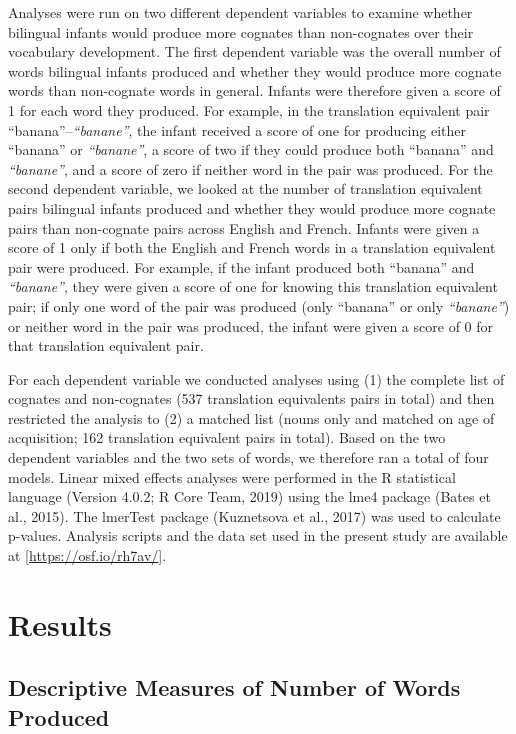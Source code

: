 \documentclass[
  english,
  ,man,floatsintext]{apa6}
\begin{document}
Analyses were run on two different dependent variables to examine whether bilingual infants would produce more cognates than non-cognates over their vocabulary development. The first dependent variable was the overall number of words bilingual infants produced and whether they would produce more cognate words than non-cognate words in general. Infants were therefore given a score of 1 for each word they produced. For example, in the translation equivalent pair ``banana''--\emph{``banane''}, the infant received a score of one for producing either ``banana'' or \emph{``banane''}, a score of two if they could produce both ``banana'' and \emph{``banane''}, and a score of zero if neither word in the pair was produced. For the second dependent variable, we looked at the number of translation equivalent pairs bilingual infants produced and whether they would produce more cognate pairs than non-cognate pairs across English and French. Infants were given a score of 1 only if both the English and French words in a translation equivalent pair were produced. For example, if the infant produced both ``banana'' and \emph{``banane''}, they were given a score of one for knowing this translation equivalent pair; if only one word of the pair was produced (only ``banana'' or only \emph{``banane''}) or neither word in the pair was produced, the infant were given a score of 0 for that translation equivalent pair.

For each dependent variable we conducted analyses using (1) the complete list of cognates and non-cognates (537 translation equivalents pairs in total) and then restricted the analysis to (2) a matched list (nouns only and matched on age of acquisition; 162 translation equivalent pairs in total). Based on the two dependent variables and the two sets of words, we therefore ran a total of four models. Linear mixed effects analyses were performed in the R statistical language (Version 4.0.2; R Core Team, 2019) using the lme4 package (Bates et al., 2015). The lmerTest package (Kuznetsova et al., 2017) was used to calculate p-values. Analysis scripts and the data set used in the present study are available at {[}\url{https://osf.io/rh7av/}{]}.

\hypertarget{results}{%
\section{Results}\label{results}}

\hypertarget{descriptive-measures-of-number-of-words-produced}{%
\subsection{Descriptive Measures of Number of Words Produced}\label{descriptive-measures-of-number-of-words-produced}}
\end{document}
